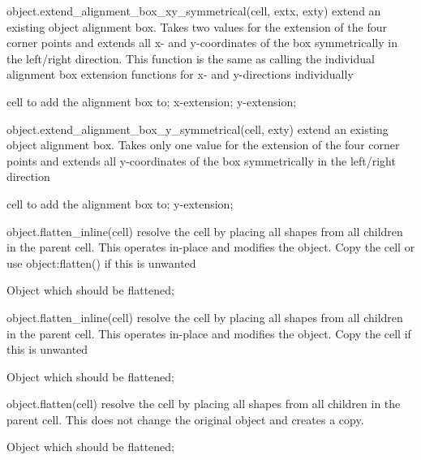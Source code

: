\begin{APIfunc}{object.extend\_alignment\_box\_xy\_symmetrical(cell, extx, exty)}
    extend an existing object alignment box. Takes two values for the extension of the four corner points and extends all x- and y-coordinates of the box symmetrically in the left/right direction. This function is the same as calling the individual alignment box extension functions for x- and y-directions individually
    \begin{APIparameters}
            cell to add the alignment box to;
            x-extension;
            y-extension;
    \end{APIparameters}
\end{APIfunc}
\begin{APIfunc}{object.extend\_alignment\_box\_y\_symmetrical(cell, exty)}
    extend an existing object alignment box. Takes only one value for the extension of the four corner points and extends all y-coordinates of the box symmetrically in the left/right direction
    \begin{APIparameters}
            cell to add the alignment box to;
            y-extension;
    \end{APIparameters}
\end{APIfunc}
\begin{APIfunc}{object.flatten\_inline(cell)}
    resolve the cell by placing all shapes from all children in the parent cell. This operates in-place and modifies the object. Copy the cell or use object:flatten() if this is unwanted
    \begin{APIparameters}
            Object which should be flattened;
    \end{APIparameters}
\end{APIfunc}
\begin{APIfunc}{object.flatten\_inline(cell)}
    resolve the cell by placing all shapes from all children in the parent cell. This operates in-place and modifies the object. Copy the cell if this is unwanted
    \begin{APIparameters}
            Object which should be flattened;
    \end{APIparameters}
\end{APIfunc}
\begin{APIfunc}{object.flatten(cell)}
    resolve the cell by placing all shapes from all children in the parent cell. This does not change the original object and creates a copy.
    \begin{APIparameters}
            Object which should be flattened;
    \end{APIparameters}
\end{APIfunc}
